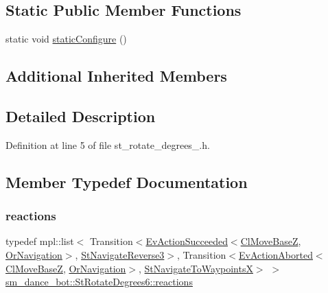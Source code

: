 \subsection*{Static Public Member Functions}
\begin{DoxyCompactItemize}
\item 
static void \hyperlink{structsm__dance__bot_1_1StRotateDegrees6_a5f6ee6518c741f6ecbb4e18957b63893}{static\+Configure} ()
\end{DoxyCompactItemize}
\subsection*{Additional Inherited Members}


\subsection{Detailed Description}


Definition at line 5 of file st\+\_\+rotate\+\_\+degrees\+\_.\+h.



\subsection{Member Typedef Documentation}
\mbox{\label{structsm__dance__bot_1_1StRotateDegrees6_a6f12012f35d4f854115f900ea511d75d}} 
\subsubsection{\texorpdfstring{reactions}{reactions}}
{\footnotesize\ttfamily typedef mpl\+::list$<$ Transition$<$\hyperlink{structsmacc_1_1default__events_1_1EvActionSucceeded}{Ev\+Action\+Succeeded}$<$\hyperlink{classcl__move__base__z_1_1ClMoveBaseZ}{Cl\+Move\+BaseZ}, \hyperlink{classsm__dance__bot_1_1OrNavigation}{Or\+Navigation}$>$, \hyperlink{structsm__dance__bot_1_1StNavigateReverse3}{St\+Navigate\+Reverse3}$>$, Transition$<$\hyperlink{structsmacc_1_1default__events_1_1EvActionAborted}{Ev\+Action\+Aborted}$<$\hyperlink{classcl__move__base__z_1_1ClMoveBaseZ}{Cl\+Move\+BaseZ}, \hyperlink{classsm__dance__bot_1_1OrNavigation}{Or\+Navigation}$>$, \hyperlink{structsm__dance__bot_1_1StNavigateToWaypointsX}{St\+Navigate\+To\+WaypointsX}$>$ $>$ \hyperlink{structsm__dance__bot_1_1StRotateDegrees6_a6f12012f35d4f854115f900ea511d75d}{sm\+\_\+dance\+\_\+bot\+::\+St\+Rotate\+Degrees6\+::reactions}}



